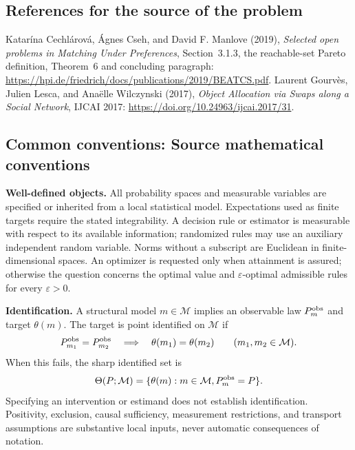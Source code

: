 \documentclass[11pt,a4paper]{article}
\begin{document}
\subsection*{References for the source of the problem}
Katar\'ina Cechl\'arov\'a, \'Agnes Cseh, and David F. Manlove (2019), \emph{Selected open problems in Matching Under Preferences}, Section~3.1.3, the reachable-set Pareto definition, Theorem~6 and concluding paragraph: \url{https://hpi.de/friedrich/docs/publications/2019/BEATCS.pdf}. Laurent Gourv\`es, Julien Lesca, and Ana\"elle Wilczynski (2017), \emph{Object Allocation via Swaps along a Social Network}, IJCAI 2017: \url{https://doi.org/10.24963/ijcai.2017/31}.

\subsection*{Common conventions: Source mathematical conventions}

\textbf{Well-defined objects.}
All probability spaces and measurable variables are specified or inherited
from a local statistical model. Expectations used as finite targets require
the stated integrability. A decision rule or estimator is measurable with
respect to its available information; randomized rules may use an auxiliary
independent random variable. Norms without a subscript are Euclidean in
finite-dimensional spaces. An optimizer is requested only when attainment
is assured; otherwise the question concerns the optimal value and
$\varepsilon$-optimal admissible rules for every $\varepsilon>0$.

\textbf{Identification.}
A structural model $m\in\mathcal M$ implies an observable law
$P_m^{\rm obs}$ and target $\theta(m)$. The target is point identified on
$\mathcal M$ if
\[
 P_{m_1}^{\rm obs}=P_{m_2}^{\rm obs}
 \quad\Longrightarrow\quad\theta(m_1)=\theta(m_2)
 \qquad(m_1,m_2\in\mathcal M).
\]
When this fails, the sharp identified set is
\[
 \Theta(P;\mathcal M)=\{\theta(m):m\in\mathcal M,
                                  P_m^{\rm obs}=P\}.
\]
Specifying an intervention or estimand does not establish identification.
Positivity, exclusion, causal sufficiency, measurement restrictions, and
transport assumptions are substantive local inputs, never automatic
consequences of notation.
\end{document}

